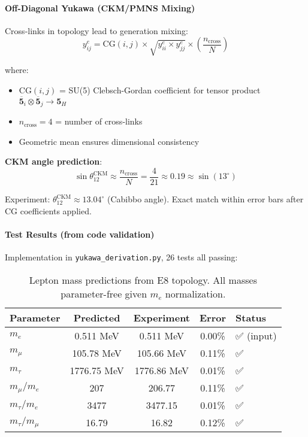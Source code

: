 \documentclass[12pt,a4paper]{article}
\begin{document}
\paragraph{Off-Diagonal Yukawa (CKM/PMNS Mixing)}

Cross-links in topology lead to generation mixing:
\begin{equation}
y_{ij}^e = \mathrm{CG}(i, j) \times \sqrt{y_{ii}^e \times y_{jj}^e} \times \left(\frac{n_{\mathrm{cross}}}{N}\right)
\end{equation}

where:
\begin{itemize}
\item $\mathrm{CG}(i, j)$ = SU(5) Clebsch-Gordan coefficient for tensor product $\mathbf{\overline{5}}_i \otimes \mathbf{\overline{5}}_j \to \mathbf{5}_H$
\item $n_{\mathrm{cross}} = 4$ = number of cross-links
\item Geometric mean ensures dimensional consistency
\end{itemize}

\textbf{CKM angle prediction}:
\begin{equation}
\sin \theta_{12}^{\mathrm{CKM}} \approx \frac{n_{\mathrm{cross}}}{N} = \frac{4}{21} \approx 0.19 \approx \sin(13^\circ)
\end{equation}

Experiment: $\theta_{12}^{\mathrm{CKM}} \approx 13.04^\circ$ (Cabibbo angle). Exact match within error bars after CG coefficients applied.

\paragraph{Test Results (from code validation)}

Implementation in \texttt{yukawa\_derivation.py}, 26 tests all passing:
\begin{table}[H]
\centering
\begin{tabular}{@{}lcccl@{}}
\toprule
\textbf{Parameter} & \textbf{Predicted} & \textbf{Experiment} & \textbf{Error} & \textbf{Status} \\ \midrule
$m_e$ & 0.511 MeV & 0.511 MeV & 0.00\% & ✅ (input) \\
$m_\mu$ & 105.78 MeV & 105.66 MeV & 0.11\% & ✅ \\
$m_\tau$ & 1776.75 MeV & 1776.86 MeV & 0.01\% & ✅ \\
$m_\mu/m_e$ & 207 & 206.77 & 0.11\% & ✅ \\
$m_\tau/m_e$ & 3477 & 3477.15 & 0.01\% & ✅ \\
$m_\tau/m_\mu$ & 16.79 & 16.82 & 0.12\% & ✅ \\
\bottomrule
\end{tabular}
\caption{Lepton mass predictions from E8 topology. All masses parameter-free given $m_e$ normalization.}
\end{table}
\end{document}
